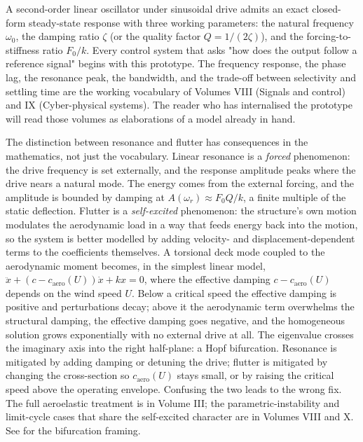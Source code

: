 \begin{principle}
A second-order linear oscillator under sinusoidal drive admits an
exact closed-form steady-state response with three working
parameters: the natural frequency $\omega_{0}$, the damping ratio
$\zeta$ (or the quality factor $Q = 1/(2\zeta)$), and the
forcing-to-stiffness ratio $F_{0}/k$. Every control system that
asks "how does the output follow a reference signal" begins with
this prototype. The frequency response, the phase lag, the
resonance peak, the bandwidth, and the trade-off between selectivity
and settling time are the working vocabulary of Volumes VIII (Signals
and control) and IX (Cyber-physical systems). The reader who has
internalised the prototype will read those volumes as elaborations
of a model already in hand.
\end{principle}

\begin{mastery}
The distinction between resonance and flutter has consequences in
the mathematics, not just the vocabulary. Linear resonance is a
\emph{forced} phenomenon: the drive frequency is set externally, and
the response amplitude peaks where the drive nears a natural mode.
The energy comes from the external forcing, and the amplitude is
bounded by damping at $A(\omega_{r}) \approx F_{0} Q/k$, a finite
multiple of the static deflection. Flutter is a \emph{self-excited}
phenomenon: the structure's own motion modulates the aerodynamic load
in a way that feeds energy back into the motion, so the system is
better modelled by adding velocity- and displacement-dependent terms
to the coefficients themselves. A torsional deck mode coupled to the
aerodynamic moment becomes, in the simplest linear model, $\ddot{x} +
(c - c_{\text{aero}}(U))\dot{x} + kx = 0$, where the effective damping
$c - c_{\text{aero}}(U)$ depends on the wind speed $U$. Below a
critical speed the effective damping is positive and perturbations
decay; above it the aerodynamic term overwhelms the structural
damping, the effective damping goes negative, and the homogeneous
solution grows exponentially with no external drive at all. The
eigenvalue crosses the imaginary axis into the right half-plane: a
Hopf bifurcation. Resonance is mitigated by adding damping or
detuning the drive; flutter is mitigated by changing the
cross-section so $c_{\text{aero}}(U)$ stays small, or by raising the
critical speed above the operating envelope. Confusing the two leads
to the wrong fix. The full aeroelastic treatment is in Volume III;
the parametric-instability and limit-cycle cases that share the
self-excited character are in Volumes VIII and X. See
\textcite{text:v2ch07-strogatz-nonlinear} for the bifurcation
framing.
\end{mastery}

